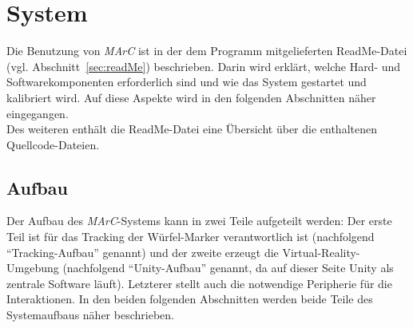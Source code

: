 \section{System}\label{sec:system}%
Die Benutzung von \textit{MArC} ist in der dem Programm mitgelieferten ReadMe-Datei (vgl. Abschnitt~\ref{sec:readMe}) beschrieben. Darin wird erklärt, welche Hard- und Softwarekomponenten erforderlich sind und wie das System gestartet und kalibriert wird. Auf diese Aspekte wird in den folgenden Abschnitten näher eingegangen.\\ 
Des weiteren enthält die ReadMe-Datei eine Übersicht über die enthaltenen Quellcode-Dateien.

\subsection{Aufbau}\label{sec:Aufbau}%
Der Aufbau des \textit{MArC}-Systems kann in zwei Teile aufgeteilt werden: Der erste Teil ist für das Tracking der Würfel-Marker verantwortlich ist (nachfolgend "`Tracking-Aufbau"' genannt) und der zweite erzeugt die Virtual-Reality-Umgebung (nachfolgend "`Unity-Aufbau"' genannt, da auf dieser Seite Unity als zentrale Software läuft). Letzterer stellt auch die notwendige Peripherie für die Interaktionen. In den beiden folgenden Abschnitten werden beide Teile des Systemaufbaus näher beschrieben.

